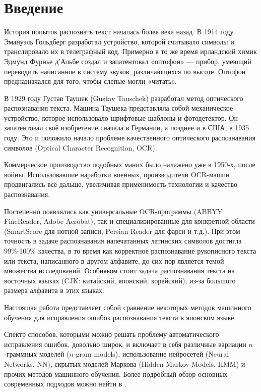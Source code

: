 \documentclass[14pt,russian]{extreport}
\theoremstyle{definition}
\begin{document}
	

\onehalfspacing

\addtocounter{page}{1}
\tableofcontents{}

\newpage
\section*{Введение}

История попыток распознать текст началась более века назад. В 1914 году Эмануэль Гольдберг разработал устройство, которой считывало символы и транслировало их в телеграфный код. Примерно в то же время ирландский химик Эдмунд Фурнье д’Альбе создал и запатентовал «оптофон» — прибор, умеющий переводить написанное в систему звуков, различающихся по высоте. Оптофон предназначался для того, чтобы слепые могли «читать».

В 1929 году Густав Таушек (Gustav Tauschek) разработал метод оптического распознавания текста. Машина Таушека представляла собой механическое устройство, которое использовало шрифтовые шаблоны и фотодетектор. Он запатентовал своё изобретение сначала в Германии, а позднее и в США, в 1935 году. Это и положило начало проблеме качественного оптического распознавания символов (Optical Character Recognition, OCR).

Коммерческое производство подобных маних было налажено уже в 1950-х, после войны. Использовавшие наработки военных, производители OCR-машин продвигались всё дальше, увеличивая применимость технологии и качество распознавания.

Постепенно появлялись как универсальные OCR-программы (ABBYY FineReader, Adobe Acrobat), так и специализированные для конкретной области (SmartScore для нотной записи, Persian Reader для фарси и т.д.). При этом точность в задаче распознавания напечатанных латинских символов достигла 99\%-100\% качества, в то время как корректное распознавание рукописного текста или текста, написанного в другом алфавите, до сих пор является темой множества исследований. Особняком стоит задача распознавания текста на восточных языках (CJK: китайский, японский, корейский), из-за большого размера алфавита в этих языках.

Настоящая работа представляет собой сравнение некоторых методов машинного обучения для исправления ошибок распознавания текста в японском языке. 

Спектр способов, которыми можно решать проблему автоматического исправления ошибок, довольно широк, и включает в себя различные вариации $n$-граммных моделей ($n$-gram models), использование нейросетей (Neural Networks, NN), скрытых моделей Маркова (Hidden Markov Models, HMM) и прочих методов машинного обучения. Более подробный обзор основных современных подходов можно найти в \cite{das:survey}.
 
\end{document}
